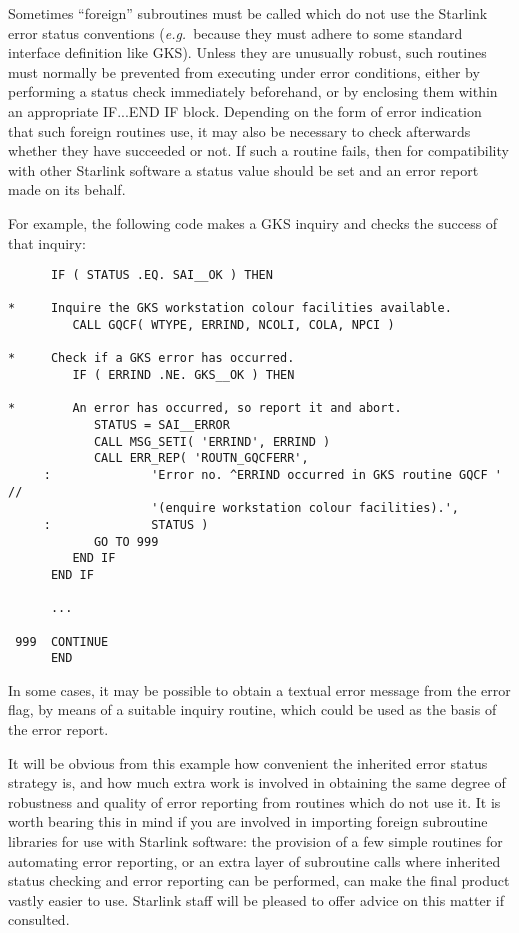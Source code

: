 \documentclass[twoside,11pt]{article}
\renewcommand{\_}{\texttt{\symbol{95}}}
\begin{document}
Sometimes ``foreign'' subroutines must be called which do not use the
Starlink error status conventions (\textit{e.g.}\ because they must adhere to some
standard interface definition like GKS).
Unless they are unusually robust, such routines must normally be prevented
from executing under error conditions, either by performing a status check
immediately beforehand, or by enclosing them within an appropriate IF...END 
IF block.
Depending on the form of error indication that such foreign routines use, it 
may also be necessary to check afterwards whether they have succeeded or 
not.
If such a routine fails, then for compatibility with other Starlink
software a status value should be set and an error report made on its
behalf. 

For example, the following code makes a GKS inquiry and checks the 
success of that inquiry:

\begin {small}
\begin{verbatim}
      IF ( STATUS .EQ. SAI__OK ) THEN

*     Inquire the GKS workstation colour facilities available.
         CALL GQCF( WTYPE, ERRIND, NCOLI, COLA, NPCI )

*     Check if a GKS error has occurred.
         IF ( ERRIND .NE. GKS__OK ) THEN

*        An error has occurred, so report it and abort.
            STATUS = SAI__ERROR
            CALL MSG_SETI( 'ERRIND', ERRIND )
            CALL ERR_REP( 'ROUTN_GQCFERR', 
     :              'Error no. ^ERRIND occurred in GKS routine GQCF ' //
                    '(enquire workstation colour facilities).',
     :              STATUS )
            GO TO 999
         END IF
      END IF

      ...

 999  CONTINUE
      END
\end{verbatim}
\end {small}

In some cases, it may be possible to obtain a textual error message from the
error flag, by means of a suitable inquiry routine, which could be used as
the basis of the error report. 

It will be obvious from this example how convenient the inherited error
status strategy is, and how much extra work is involved in obtaining the
same degree of robustness and quality of error reporting from routines
which do not use it. 
It is worth bearing this in mind if you are involved in importing foreign
subroutine libraries for use with Starlink software: the provision of a few
simple routines for automating error reporting, or an extra layer of
subroutine calls where inherited status checking and error reporting can be
performed, can make the final product vastly easier to use. 
Starlink staff will be pleased to offer advice on this matter if consulted.
\end{document}
